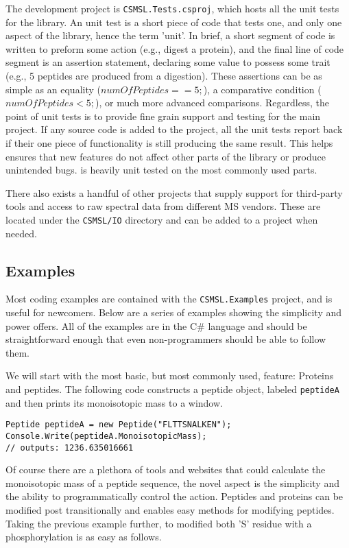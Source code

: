 The development project is \texttt{CSMSL.Tests.csproj}, which hosts all the unit tests for the library. An unit test is a short piece of code that tests one, and only one aspect of the library, hence the term 'unit'. In brief, a short segment of code is written to preform some action (e.g., digest a protein), and the final line of code segment is an assertion statement, declaring some value to possess some trait (e.g., 5 peptides are produced from a digestion). These assertions can be as simple as an equality ($numOfPeptides == 5;$), a comparative condition ($numOfPeptides < 5;$), or much more advanced comparisons. Regardless, the point of unit tests is to provide fine grain support and testing for the main project. If any source code is added to the project, all the unit tests report back if their one piece of functionality is still producing the same result. This helps ensures that new features do not affect other parts of the library or produce unintended bugs. \csmsl{} is heavily unit tested on the most commonly used parts.

There also exists a handful of other projects that supply support for third-party tools and access to raw spectral data from different MS vendors. These are located under the \texttt{CSMSL/IO} directory and can be added to a project when needed.

\subsection*{Examples}
Most coding examples are contained with the \texttt{CSMSL.Examples} project, and is useful for newcomers. Below are a series of examples showing the simplicity and power \csmsl{} offers. All of the examples are in the C\# language and should be straightforward enough that even non-programmers should be able to follow them.

We will start with the most basic, but most commonly used, feature: Proteins and peptides. The following code constructs a peptide object, labeled \texttt{peptideA} and then prints its monoisotopic mass to a window.

\begin{lstlisting}
Peptide peptideA = new Peptide("FLTTSNALKEN");
Console.Write(peptideA.MonoisotopicMass);
// outputs: 1236.635016661
\end{lstlisting}

Of course there are a plethora of tools and websites that could calculate the monoisotopic mass of a peptide sequence, the novel aspect is the simplicity and the ability to programmatically control the action. Peptides and proteins can be modified post transitionally and \csmsl{} enables easy methods for modifying peptides. Taking the previous example further, to modified both 'S' residue with a phosphorylation is as easy as follows.

